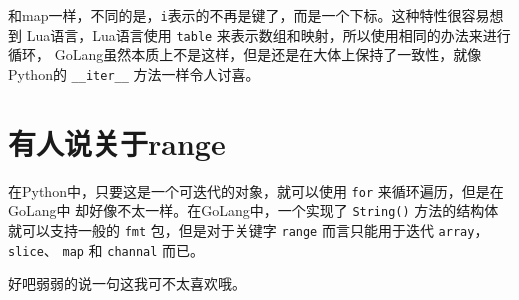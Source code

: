 和map一样，不同的是，\verb|i|表示的不再是键了，而是一个下标。这种特性很容易想到
Lua语言，Lua语言使用 \verb|table| 来表示数组和映射，所以使用相同的办法来进行循环，
GoLang虽然本质上不是这样，但是还是在大体上保持了一致性，就像Python的 \verb|__iter__|
方法一样令人讨喜。

\section{有人说关于range}

在Python中，只要这是一个可迭代的对象，就可以使用 \verb|for| 来循环遍历，但是在GoLang中
却好像不太一样。在GoLang中，一个实现了 \verb|String()| 方法的结构体就可以支持一般的
\verb|fmt| 包，但是对于关键字 \verb|range| 而言只能用于迭代 \verb|array|，\verb|slice|、%
\verb|map| 和 \verb|channal| 而已。

好吧弱弱的说一句这我可不太喜欢哦。

